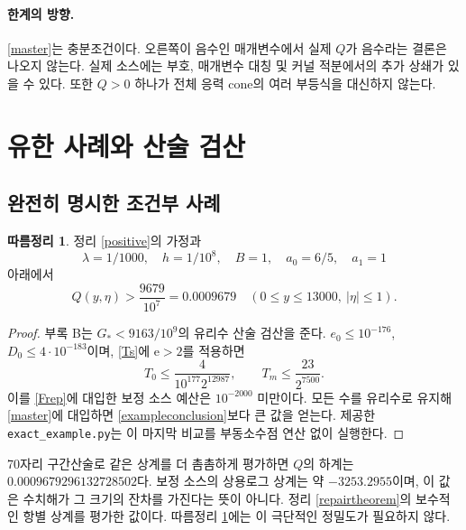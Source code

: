 \documentclass[11pt,a4paper]{article}
\theoremstyle{definition}
\newtheorem{corollary}[theorem]{따름정리}
\theoremstyle{remark}\newtheorem{remark}[theorem]{주의}
\newcommand{\e}{\mathrm e}
\begin{document}
\paragraph{한계의 방향.}
\eqref{master}는 충분조건이다. 오른쪽이 음수인 매개변수에서 실제 $Q$가 음수라는 결론은 나오지 않는다. 실제 소스에는 부호, 매개변수 대칭 및 커널 적분에서의 추가 상쇄가 있을 수 있다. 또한 $Q>0$ 하나가 전체 응력 cone의 여러 부등식을 대신하지 않는다.

\section{유한 사례와 산술 검산}
\subsection{완전히 명시한 조건부 사례}
\begin{corollary}\label{example}
정리 \ref{positive}의 가정과
\begin{equation}\label{exampleparams}
 \lambda=1/1000,\quad h=1/10^8,\quad B=1,\quad
 a_0=6/5,\quad a_1=1
\end{equation}
아래에서
\begin{equation}\label{exampleconclusion}
 Q(y,\eta)>\frac{9679}{10^7}=0.0009679
 \quad(0\le y\le13000,\ |\eta|\le1).
\end{equation}
\end{corollary}
\begin{proof}
부록 B는 $G_*<9163/10^9$의 유리수 산술 검산을 준다. $e_0\le10^{-176}$, $D_0\le4\cdot10^{-183}$이며, \eqref{Ts}에 $\e>2$를 적용하면
\begin{equation}
 T_0\le\frac4{10^{177}2^{12987}},\qquad
 T_m\le\frac{23}{2^{7500}}.
\end{equation}
이를 \eqref{Frep}에 대입한 보정 소스 예산은 $10^{-2000}$ 미만이다. 모든 수를 유리수로 유지해 \eqref{master}에 대입하면 \eqref{exampleconclusion}보다 큰 값을 얻는다. 제공한 \texttt{exact\_example.py}는 이 마지막 비교를 부동소수점 연산 없이 실행한다.
\end{proof}

70자리 구간산술로 같은 상계를 더 촘촘하게 평가하면 $Q$의 하계는
$0.0009679296132728502$다. 보정 소스의 상용로그 상계는 약 $-3253.2955$이며,
이 값은 수치해가 그 크기의 잔차를 가진다는 뜻이 아니다. 정리 \ref{repairtheorem}의 보수적인 항별 상계를 평가한 값이다. 따름정리 \ref{example}에는 이 극단적인 정밀도가 필요하지 않다.
\end{document}
